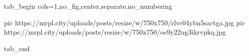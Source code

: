  
 
 
 
 


\ifcmt
  tab_begin cols=1,no_fig,center,separate,no_numbering

     pic https://mrpl.city/uploads/posts/resize/w/750x750/rlvc04ybn5sactga.jpg
     pic https://mrpl.city/uploads/posts/resize/w/750x750/oe9y22ug3ikrvpkq.jpg

  tab_end
\fi

